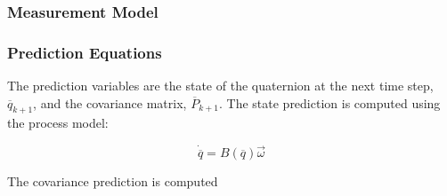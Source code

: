 \documentclass{article}
\begin{document}
\begin{flushleft}
\subsubsection{Measurement Model}

\subsubsection{Prediction Equations}

The prediction variables are the state of the quaternion at the next time step, $\overline{q}_{k+1}$, and the covariance matrix, $\overline{P}_{k+1}$. The state prediction is computed using the process model: 

\[ \dot{\overline{q}} = B(\overline{q}) \vec{\omega} \]

The covariance prediction is computed 






\end{flushleft}
\end{document}
